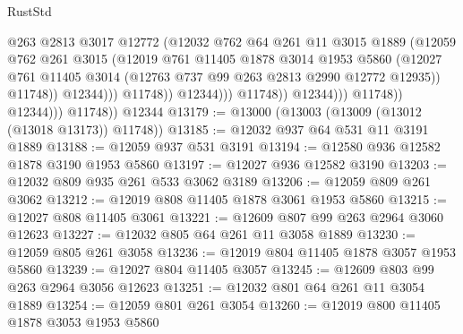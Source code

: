 \begin{lexlean}{RustStd}
\begin{coremodule}
                                          @263
                                          @2813
                                          @3017
                                          @12772
                                          (@12032
                                            @762
                                            @64
                                            @261
                                            @11
                                            @3015
                                            @1889
                                            (@12059
                                              @762
                                              @261
                                              @3015
                                              (@12019
                                                @761
                                                @11405
                                                @1878
                                                @3014
                                                @1953
                                                @5860
                                                (@12027
                                                  @761
                                                  @11405
                                                  @3014
                                                  (@12763 @737 @99 @263 @2813 @2990 @12772 @12935))
                                                @11748))
                                            @12344)))
                                      @11748))
                                  @12344)))
                            @11748))
                        @12344)))
                  @11748))
              @12344)))
        @11748))
    @12344
@13179 := @13000 (@13003 (@13009 (@13012 (@13018 @13173)) @11748))
@13185 := @12032 @937 @64 @531 @11 @3191 @1889
@13188 := @12059 @937 @531 @3191
@13194 := @12580 @936 @12582 @1878 @3190 @1953 @5860
@13197 := @12027 @936 @12582 @3190
@13203 := @12032 @809 @935 @261 @533 @3062 @3189
@13206 := @12059 @809 @261 @3062
@13212 := @12019 @808 @11405 @1878 @3061 @1953 @5860
@13215 := @12027 @808 @11405 @3061
@13221 := @12609 @807 @99 @263 @2964 @3060 @12623
@13227 := @12032 @805 @64 @261 @11 @3058 @1889
@13230 := @12059 @805 @261 @3058
@13236 := @12019 @804 @11405 @1878 @3057 @1953 @5860
@13239 := @12027 @804 @11405 @3057
@13245 := @12609 @803 @99 @263 @2964 @3056 @12623
@13251 := @12032 @801 @64 @261 @11 @3054 @1889
@13254 := @12059 @801 @261 @3054
@13260 := @12019 @800 @11405 @1878 @3053 @1953 @5860

\end{coremodule}
\end{lexlean}
